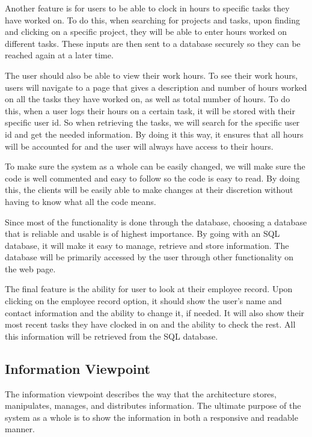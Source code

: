 \documentclass[letterpaper,10pt,titlepage,journal,compsoc,draftclsnofoot,onecolumn]{IEEEtran}
\begin{document}
Another feature is for users to be able to clock in hours to specific tasks they have worked on. To do this, when searching for projects and tasks, upon finding and clicking on a specific project, they will be able to enter hours worked on different tasks. These inputs are then sent to a database securely so they can be reached again at a later time. 


The user should also be able to view their work hours. To see their work hours, users will navigate to a page that gives a description and number of hours worked on all the tasks they have worked on, as well as total number of hours. To do this, when a user logs their hours on a certain task, it will be stored with their specific user id. So when retrieving the tasks, we will search for the specific user id and get the needed information. By doing it this way, it ensures that all hours will be accounted for and the user will always have access to their hours. 


To make sure the system as a whole can be easily changed, we will make sure the code is well commented and easy to follow so the code is easy to read. By doing this, the clients will be easily able to make changes at their discretion without having to know what all the code means. 


Since most of the functionality is done through the database, choosing a database that is reliable and usable is of highest importance. By going with an SQL database, it will make it easy to manage, retrieve and store information. The database will be primarily accessed by the user through other functionality on the web page. 


The final feature is the ability for user to look at their employee record. Upon clicking on the employee record option, it should show the user’s name and contact information and the ability to change it, if needed. It will also show their most recent tasks they have clocked in on and the ability to check the rest. All this information will be retrieved from the SQL database.

\subsection{Information Viewpoint}

The information viewpoint describes the way that the architecture stores, manipulates, manages, and distributes information. The ultimate purpose of the system as a whole is to show the information in both a responsive and readable manner. 
\end{document}
